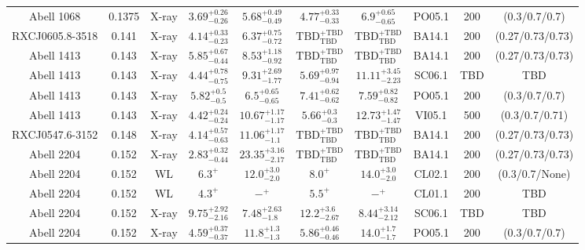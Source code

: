 \begin{table}
\begin{tabular}{cccccccccc}
Abell 1068 & 0.1375 & X-ray & ${3.69}^{+0.26}_{-0.26}$ & ${5.68}^{+0.49}_{-0.49}$ & ${4.77}^{+0.33}_{-0.33}$ & ${6.9}^{+0.65}_{-0.65}$ & PO05.1 & 200 & (0.3/0.7/0.7) \\
RXCJ0605.8-3518 & 0.141 & X-ray & ${4.14}^{+0.33}_{-0.23}$ & ${6.37}^{+0.75}_{-0.72}$ & ${\mathrm{TBD}}^{+\mathrm{TBD}}_{\mathrm{TBD}}$ & ${\mathrm{TBD}}^{+\mathrm{TBD}}_{\mathrm{TBD}}$ & BA14.1 & 200 & (0.27/0.73/0.73) \\
Abell 1413 & 0.143 & X-ray & ${5.85}^{+0.67}_{-0.44}$ & ${8.53}^{+1.18}_{-0.92}$ & ${\mathrm{TBD}}^{+\mathrm{TBD}}_{\mathrm{TBD}}$ & ${\mathrm{TBD}}^{+\mathrm{TBD}}_{\mathrm{TBD}}$ & BA14.1 & 200 & (0.27/0.73/0.73) \\
Abell 1413 & 0.143 & X-ray & ${4.44}^{+0.78}_{-0.75}$ & ${9.31}^{+2.69}_{-1.77}$ & ${5.69}^{+0.97}_{-0.94}$ & ${11.11}^{+3.45}_{-2.23}$ & SC06.1 & TBD & TBD \\
Abell 1413 & 0.143 & X-ray & ${5.82}^{+0.5}_{-0.5}$ & ${6.5}^{+0.65}_{-0.65}$ & ${7.41}^{+0.62}_{-0.62}$ & ${7.59}^{+0.82}_{-0.82}$ & PO05.1 & 200 & (0.3/0.7/0.7) \\
Abell 1413 & 0.143 & X-ray & ${4.42}^{+0.24}_{-0.24}$ & ${10.67}^{+1.17}_{-1.17}$ & ${5.66}^{+0.3}_{-0.3}$ & ${12.73}^{+1.47}_{-1.47}$ & VI05.1 & 500 & (0.3/0.7/0.71) \\
RXCJ0547.6-3152 & 0.148 & X-ray & ${4.14}^{+0.57}_{-0.63}$ & ${11.06}^{+1.17}_{-1.1}$ & ${\mathrm{TBD}}^{+\mathrm{TBD}}_{\mathrm{TBD}}$ & ${\mathrm{TBD}}^{+\mathrm{TBD}}_{\mathrm{TBD}}$ & BA14.1 & 200 & (0.27/0.73/0.73) \\
Abell 2204 & 0.152 & X-ray & ${2.83}^{+0.32}_{-0.44}$ & ${23.35}^{+3.16}_{-2.17}$ & ${\mathrm{TBD}}^{+\mathrm{TBD}}_{\mathrm{TBD}}$ & ${\mathrm{TBD}}^{+\mathrm{TBD}}_{\mathrm{TBD}}$ & BA14.1 & 200 & (0.27/0.73/0.73) \\
Abell 2204 & 0.152 & WL & ${6.3}^{+}_{}$ & ${12.0}^{+3.0}_{-2.0}$ & ${8.0}^{+}_{}$ & ${14.0}^{+3.0}_{-2.0}$ & CL02.1 & 200 & (0.3/0.7/None) \\
Abell 2204 & 0.152 & WL & ${4.3}^{+}_{}$ & ${-}^{+}_{}$ & ${5.5}^{+}_{}$ & ${-}^{+}_{}$ & CL01.1 & 200 & TBD \\
Abell 2204 & 0.152 & X-ray & ${9.75}^{+2.92}_{-2.16}$ & ${7.48}^{+2.63}_{-1.8}$ & ${12.2}^{+3.6}_{-2.67}$ & ${8.44}^{+3.14}_{-2.12}$ & SC06.1 & TBD & TBD \\
Abell 2204 & 0.152 & X-ray & ${4.59}^{+0.37}_{-0.37}$ & ${11.8}^{+1.3}_{-1.3}$ & ${5.86}^{+0.46}_{-0.46}$ & ${14.0}^{+1.7}_{-1.7}$ & PO05.1 & 200 & (0.3/0.7/0.7) \\

\end{tabular}
\end{table}
